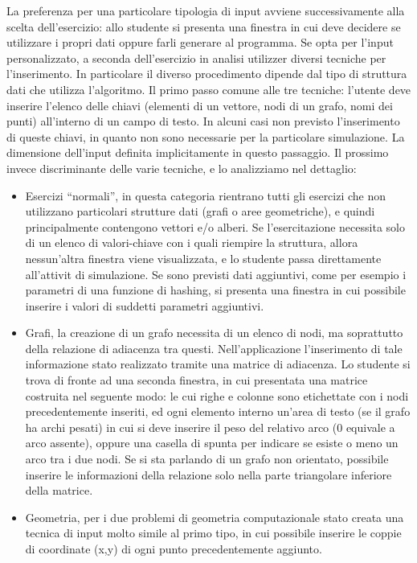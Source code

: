 La preferenza per una particolare tipologia di input avviene successivamente
alla scelta dell'esercizio: allo studente si presenta una finestra
in cui deve decidere se utilizzare i propri dati oppure farli generare
al programma. Se opta per l'input personalizzato, a seconda dell'esercizio
in analisi utilizzer diversi tecniche per l'inserimento. In particolare
il diverso procedimento dipende dal tipo di struttura dati che utilizza
l'algoritmo. Il primo passo  comune alle tre tecniche: l'utente deve
inserire l'elenco delle chiavi (elementi di un vettore, nodi di un
grafo, nomi dei punti) all'interno di un campo di testo. In alcuni
casi non  previsto l'inserimento di queste chiavi, in quanto non
sono necessarie per la particolare simulazione. La dimensione dell'input
 definita implicitamente in questo passaggio. Il prossimo  invece
discriminante delle varie tecniche, e lo analizziamo nel dettaglio:
\begin{itemize}
\item Esercizi {}``normali'', in questa categoria rientrano tutti gli
esercizi che non utilizzano particolari strutture dati (grafi o aree
geometriche), e quindi principalmente contengono vettori e/o alberi.
Se l'esercitazione necessita solo di un elenco di valori-chiave con
i quali riempire la struttura, allora nessun'altra finestra viene
visualizzata, e lo studente passa direttamente all'attivit di simulazione.
Se sono previsti dati aggiuntivi, come per esempio i parametri di
una funzione di hashing, si presenta una finestra in cui  possibile
inserire i valori di suddetti parametri aggiuntivi.
\item Grafi, la creazione di un grafo necessita di un elenco di nodi, ma
soprattutto della relazione di adiacenza tra questi. Nell'applicazione
l'inserimento di tale informazione  stato realizzato tramite una
matrice di adiacenza. Lo studente si trova di fronte ad una seconda
finestra, in cui  presentata una matrice costruita nel seguente modo:
le cui righe e colonne sono etichettate con i nodi precedentemente
inseriti, ed ogni elemento interno  un'area di testo (se il grafo
ha archi pesati) in cui si deve inserire il peso del relativo arco
(0 equivale a arco assente), oppure una casella di spunta per indicare
se esiste o meno un arco tra i due nodi. Se si sta parlando di un
grafo non orientato,  possibile inserire le informazioni della relazione
solo nella parte triangolare inferiore della matrice.
\item Geometria, per i due problemi di geometria computazionale  stato
creata una tecnica di input molto simile al primo tipo, in cui  possibile
inserire le coppie di coordinate (x,y) di ogni punto precedentemente
aggiunto.
\end{itemize}
